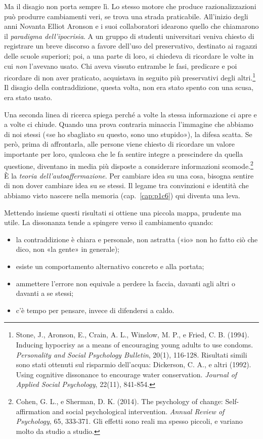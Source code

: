 Ma il disagio non porta sempre lì. Lo stesso motore che produce razionalizzazioni può produrre cambiamenti veri, se trova una strada praticabile. All'inizio degli anni Novanta Elliot Aronson e i suoi collaboratori idearono quello che chiamarono il \textit{paradigma dell'ipocrisia}. A un gruppo di studenti universitari veniva chiesto di registrare un breve discorso a favore dell'uso del preservativo, destinato ai ragazzi delle scuole superiori; poi, a una parte di loro, si chiedeva di ricordare le volte in cui \textit{non} l'avevano usato. Chi aveva vissuto entrambe le fasi, predicare e poi ricordare di non aver praticato, acquistava in seguito più preservativi degli altri.\footnote{Stone, J., Aronson, E., Crain, A. L., Winslow, M. P., e Fried, C. B. (1994). Inducing hypocrisy as a means of encouraging young adults to use condoms. \textit{Personality and Social Psychology Bulletin}, 20(1), 116-128. Risultati simili sono stati ottenuti sul risparmio dell'acqua: Dickerson, C. A., e altri (1992). Using cognitive dissonance to encourage water conservation. \textit{Journal of Applied Social Psychology}, 22(11), 841-854.} Il disagio della contraddizione, questa volta, non era stato spento con una scusa, era stato usato.

Una seconda linea di ricerca spiega perché a volte la stessa informazione ci apre e a volte ci chiude. Quando una prova contraria minaccia l'immagine che abbiamo di noi stessi («se ho sbagliato su questo, sono uno stupido»), la difesa scatta. Se però, prima di affrontarla, alle persone viene chiesto di ricordare un valore importante per loro, qualcosa che le fa sentire integre a prescindere da quella questione, diventano in media più disposte a considerare informazioni scomode.\footnote{Cohen, G. L., e Sherman, D. K. (2014). The psychology of change: Self-affirmation and social psychological intervention. \textit{Annual Review of Psychology}, 65, 333-371. Gli effetti sono reali ma spesso piccoli, e variano molto da studio a studio.} È la \textit{teoria dell'autoaffermazione}. Per cambiare idea su una cosa, bisogna sentire di non dover cambiare idea su se stessi. Il legame tra convinzioni e identità che abbiamo visto nascere nella memoria (cap.~\ref{cap:p1c6}) qui diventa una leva.

Mettendo insieme questi risultati si ottiene una piccola mappa, prudente ma utile. La dissonanza tende a spingere verso il cambiamento quando:

\begin{itemize}
	\item la contraddizione è chiara e personale, non astratta («io» non ho fatto ciò che dico, non «la gente» in generale);
	\item esiste un comportamento alternativo concreto e alla portata;
	\item ammettere l'errore non equivale a perdere la faccia, davanti agli altri o davanti a se stessi;
	\item c'è tempo per pensare, invece di difendersi a caldo.
\end{itemize}

